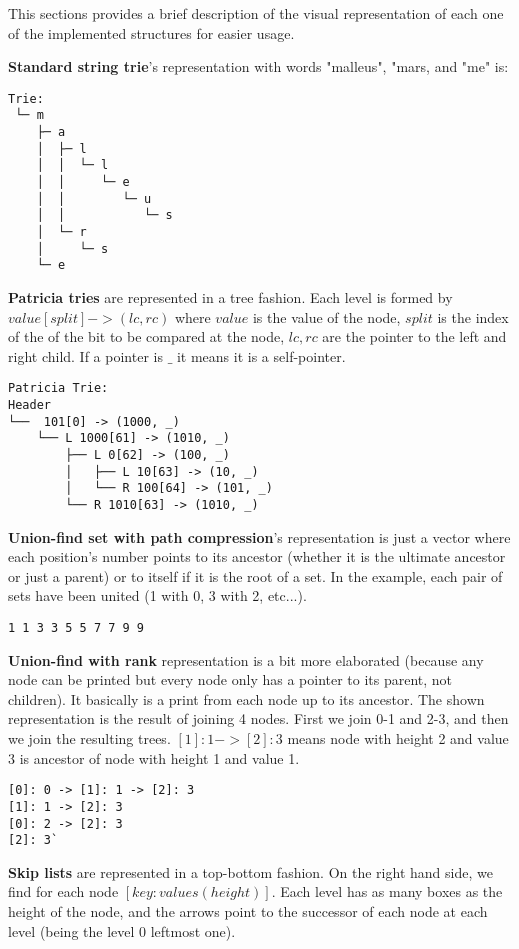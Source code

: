 \documentclass[a4paper,10pt,table,xcdraw]{article}
\begin{document}
\begin{appendices}
This sections provides a brief description of the visual representation of each one of the implemented structures for easier usage.

\textbf{Standard string trie}'s representation with words "malleus", "mars, and "me" is:

\begin{verbatim}
Trie:
 └─ m
    ├─ a
    │  ├─ l
    │  │  └─ l
    │  │     └─ e
    │  │        └─ u
    │  │           └─ s
    │  └─ r
    │     └─ s
    └─ e
\end{verbatim}

\textbf{Patricia tries} are represented in a tree fashion. Each level is formed by $value[split] -> (lc, rc) $ where $value$ is the value of the node, $split$ is the index of the of the bit to be compared at the node, $lc, rc$ are the pointer to the left and right child. If a pointer is $\_$ it means it is a self-pointer.

\begin{verbatim}
Patricia Trie:
Header
└──  101[0] -> (1000, _)
    └── L 1000[61] -> (1010, _)
        ├── L 0[62] -> (100, _)
        │   ├── L 10[63] -> (10, _)
        │   └── R 100[64] -> (101, _)
        └── R 1010[63] -> (1010, _)
\end{verbatim}

\textbf{Union-find set with path compression}'s representation is just a vector where each position's number points to its ancestor (whether it is the ultimate ancestor or just a parent) or to itself if it is the root of a set. In the example, each pair of sets have been united (1 with 0, 3 with 2, etc...). 

\begin{verbatim}
1 1 3 3 5 5 7 7 9 9 
\end{verbatim}

\textbf{Union-find with rank} representation is a bit more elaborated (because any node can be printed but every node only has a pointer to its parent, not children). It basically is a print from each node up to its ancestor. The shown representation is the result of joining 4 nodes. First we join 0-1 and 2-3, and then we join the resulting trees. $[1]: 1 -> [2]: 3$ means node with height 2 and value 3 is ancestor of node with height 1 and value 1.

\begin{verbatim}
[0]: 0 -> [1]: 1 -> [2]: 3
[1]: 1 -> [2]: 3
[0]: 2 -> [2]: 3
[2]: 3`
\end{verbatim}

\textbf{Skip lists} are represented in a top-bottom fashion.  On the right hand side, we find for each node $[key: values (height)]$. Each level has as many boxes as the height of the node, and the arrows point to the successor of each node at each level (being the level 0 leftmost one).
    

\end{appendices}
\end{document}
